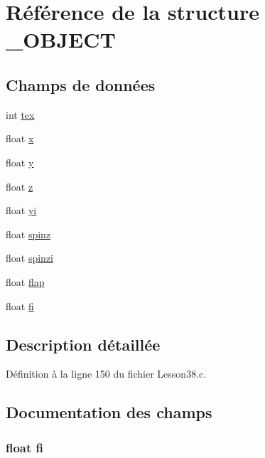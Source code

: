 \hypertarget{struct___o_b_j_e_c_t}{}\section{Référence de la structure \+\_\+\+O\+B\+J\+E\+CT}
\label{struct___o_b_j_e_c_t}
\subsection*{Champs de données}
\begin{DoxyCompactItemize}
\item 
int \hyperlink{struct___o_b_j_e_c_t_a255fdf9357684c4a0b09bcffff73dd48}{tex}
\item 
float \hyperlink{struct___o_b_j_e_c_t_ad0da36b2558901e21e7a30f6c227a45e}{x}
\item 
float \hyperlink{struct___o_b_j_e_c_t_aa4f0d3eebc3c443f9be81bf48561a217}{y}
\item 
float \hyperlink{struct___o_b_j_e_c_t_af73583b1e980b0aa03f9884812e9fd4d}{z}
\item 
float \hyperlink{struct___o_b_j_e_c_t_a2700b8bdea86358af21700a5694ed3a9}{yi}
\item 
float \hyperlink{struct___o_b_j_e_c_t_a1e9781c9616932eab85f5233862f725d}{spinz}
\item 
float \hyperlink{struct___o_b_j_e_c_t_a355523f4d5ded6cde610d899ccce8f19}{spinzi}
\item 
float \hyperlink{struct___o_b_j_e_c_t_adade12d31fb9ee68283a9f6e6f87ff2b}{flap}
\item 
float \hyperlink{struct___o_b_j_e_c_t_a96506b6974aa15a1dfa2ad3e6106dee0}{fi}
\end{DoxyCompactItemize}


\subsection{Description détaillée}


Définition à la ligne 150 du fichier Lesson38.\+c.



\subsection{Documentation des champs}
\subsubsection[{\texorpdfstring{fi}{fi}}]{\setlength{\rightskip}{0pt plus 5cm}float fi}\hypertarget{struct___o_b_j_e_c_t_a96506b6974aa15a1dfa2ad3e6106dee0}{}\label{struct___o_b_j_e_c_t_a96506b6974aa15a1dfa2ad3e6106dee0}


